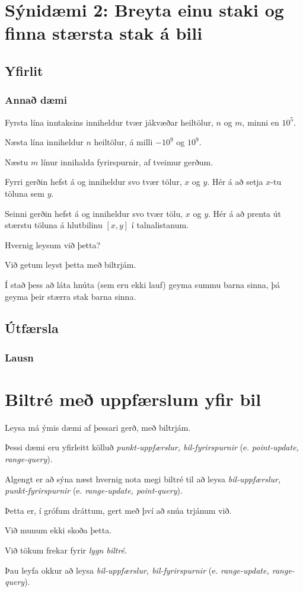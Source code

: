 \section{Sýnidæmi 2: Breyta einu staki og finna stærsta stak á bili}
\subsection{Yfirlit}
{
    \frametitle{Annað dæmi}
    {
        \item<1-> Fyrsta lína inntaksins inniheldur tvær jákvæðar heiltölur, $n$ og $m$, minni en $10^5$.
        \item<2-> Næsta lína inniheldur $n$ heiltölur, á milli $-10^9$ og $10^9$.
        \item<3-> Næstu $m$ línur innihalda fyrirspurnir, af tveimur gerðum. 
        \item<4-> Fyrri gerðin hefst á  og inniheldur svo tvær tölur, $x$ og $y$. Hér á að setja $x$-tu töluna sem $y$.
        \item<5-> Seinni gerðin hefst á  og inniheldur svo tvær tölu,
            $x$ og $y$. Hér á að prenta út stærstu töluna á hlutbilinu $[x, y]$ í talnalistanum.
        \item<6-> Hvernig leysum við þetta?
    }
}

{
    {
        \item<1-> Við getum leyst þetta með biltrjám.
        \item<2-> Í stað þess að láta hnúta (sem eru ekki lauf) geyma summu barna sinna, þá geyma þeir stærra stak barna sinna.
    }
}

\subsection{Útfærsla}
{
    \frametitle{Lausn}
}

\section{Biltré með uppfærslum yfir bil}
{
    {
        \item<1-> Leysa má ýmis dæmi af þessari gerð, með biltrjám.
        \item<2-> Þessi dæmi eru yfirleitt kölluð \emph{punkt-uppfærslur, bil-fyrirspurnir} (e. \emph{point-update, range-query}).
        \item<3-> Algengt er að sýna næst hvernig nota megi biltré til að leysa \emph{bil-uppfærslur, punkt-fyrirspurnir}
                    (e. \emph{range-update, point-query}).
        \item<4-> Þetta er, í grófum dráttum, gert með því að snúa trjánum við.
        \item<5-> Við munum ekki skoða þetta.
        \item<6-> Við tökum frekar fyrir \emph{lygn biltré}.
        \item<7-> Þau leyfa okkur að leysa \emph{bil-uppfærslur, bil-fyrirspurnir} (e. \emph{range-update, range-query}).
    }
}

